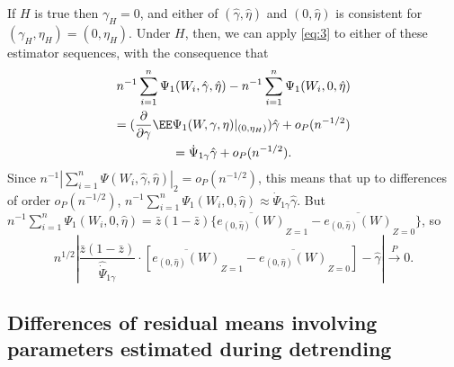 If $H$ is true then $\gamma_{H}=0$, and either of $(\hat\gamma,
\hat\eta)$ and $(0, \hat\eta)$  is consistent for $(\gamma_H,
\eta_H) = (0, \eta_{H})$.  Under $H$, then, we can apply \eqref{eq:3}
to either of these estimator sequences, with the consequence that
\begin{multline*}
n^{-1}\sum_{i=1}^n \Psi_1(W_i, \hat{\gamma}, \hat{\eta}) - n^{-1}\sum_{i=1}^n \Psi_1(W_i, 0, \hat{\eta})\\= (\frac{\partial}{\partial\gamma} \EE \Psi_{1}(W,\gamma, \eta)
|_{(0, \eta_{H})}) \hat{\gamma} + o_{P}(n^{-1/2}) \\
= {\dot{\Psi}}_{1\gamma} \hat{\gamma} + o_{P}(n^{-1/2}) .
\end{multline*}
Since $n^{-1}|\sum_{i=1}^n \Psi(W_i, \hat{\gamma}, \hat{\eta})|_{2} =
o_{P}(n^{-1/2})$, this means that up to differences of order
$o_{P}(n^{-1/2})$, $n^{-1}\sum_{i=1}^n \Psi_1(W_i, 0, \hat{\eta})
\approx  \dot{\Psi}_{1 \gamma} \hat\gamma$.  But
$n^{-1}\sum_{i=1}^n \Psi_1(W_i, 0, \hat{\eta}) =
\bar{z}(1-\bar{z})\{\overline{e_{(0,\hat\eta)}(W)}_{Z=1} -
\overline{e_{(0,\hat\eta)}(W)}_{Z=0}\}$, so
\begin{equation*}
n^{1/2}\left| \frac{\bar{z}(1-\bar{z})}{\hat{\dot{\Psi}}_{1\gamma} }
\cdot
\left[
\overline{e_{(0,\hat\eta)}(W)}_{Z=1} -
\overline{e_{(0,\hat\eta)}(W)}_{Z=0} \right]
- \hat\gamma \right|
\stackrel{P}{\rightarrow} 0.
\end{equation*}

\subsection{Differences of residual means involving parameters estimated during detrending}
\label{apnd:requ-forpr-eqref}


